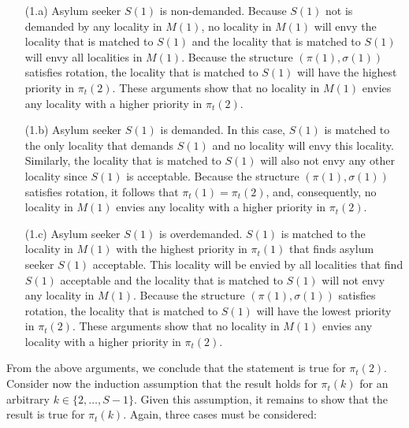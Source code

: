 \documentclass[12pt,fleqn]{article}
\begin{document}
\begin{itemize}

\item[(1.a)] Asylum seeker $S(1)$ is non-demanded. Because $S(1)$ not is demanded by any locality in $M(1)$, no
locality in $M(1)$ will envy the locality that is matched to $S(1)$ and the locality that is
matched to $S(1)$ will envy all localities in $M(1)$. Because the structure $(\pi(1),\sigma(1))$ satisfies
rotation, the locality that is matched to $S(1)$ will have the highest priority in $\pi_t(2)$. These arguments
show that no locality in $M(1)$ envies any locality with a higher priority in $\pi_t(2)$.

\item[(1.b)] Asylum seeker $S(1)$ is demanded. In this case, $S(1)$ is matched to the only locality that demands
$S(1)$ and no locality will envy this locality. Similarly, the locality that is matched to $S(1)$ will also not envy any other locality since $S(1)$ is acceptable. Because the structure $(\pi(1),\sigma(1))$ satisfies rotation,
it follows that $\pi_t(1)=\pi_t(2)$, and, consequently, no locality in $M(1)$ envies any
locality with a higher priority in $\pi_t(2)$.

\item[(1.c)] Asylum seeker $S(1)$ is overdemanded. $S(1)$ is matched to the locality in $M(1)$ with the highest
priority in $\pi_t(1)$ that finds asylum seeker $S(1)$ acceptable. This locality will be envied by all
localities that find $S(1)$ acceptable and the locality that is matched to $S(1)$ will not envy any
locality in $M(1)$. Because the structure $(\pi(1),\sigma(1))$ satisfies rotation, the
locality that is matched to $S(1)$ will have the lowest priority in $\pi_t(2)$. These arguments show that no
locality in $M(1)$ envies any locality with a higher priority in $\pi_t(2)$.

\end{itemize}

\noindent From the above arguments, we conclude that the statement is true for $\pi_t(2)$. Consider now the
induction assumption that the result holds for $\pi_t(k)$ for an arbitrary $k\in \{2,\ldots,S-1\}$. Given this
assumption, it remains to show that the result is true for $\pi_t(k)$. Again, three cases must be considered:
\end{document}
